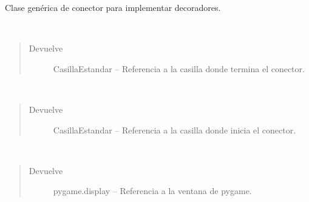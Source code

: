 \documentclass[letterpaper,10pt,english]{sphinxmanual}
\begin{document}

\begin{fulllineitems}
\label{\detokenize{codigo:conector.ConectorSE}}
Clase genérica de conector para implementar decoradores.

\begin{fulllineitems}
\label{\detokenize{codigo:conector.ConectorSE.getCasillaFinal}}~\begin{quote}\begin{description}
\item[{Devuelve}] \leavevmode
CasillaEstandar -- Referencia a la casilla donde termina el conector.

\end{description}\end{quote}

\end{fulllineitems}


\begin{fulllineitems}
\label{\detokenize{codigo:conector.ConectorSE.getCasillaInicio}}~\begin{quote}\begin{description}
\item[{Devuelve}] \leavevmode
CasillaEstandar -- Referencia a la casilla donde inicia el conector.

\end{description}\end{quote}

\end{fulllineitems}


\begin{fulllineitems}
\label{\detokenize{codigo:conector.ConectorSE.getVentana}}~\begin{quote}\begin{description}
\item[{Devuelve}] \leavevmode
pygame.display -- Referencia a la ventana de pygame.


\end{description}
\end{quote}
\end{fulllineitems}
\end{fulllineitems}
\end{document}
